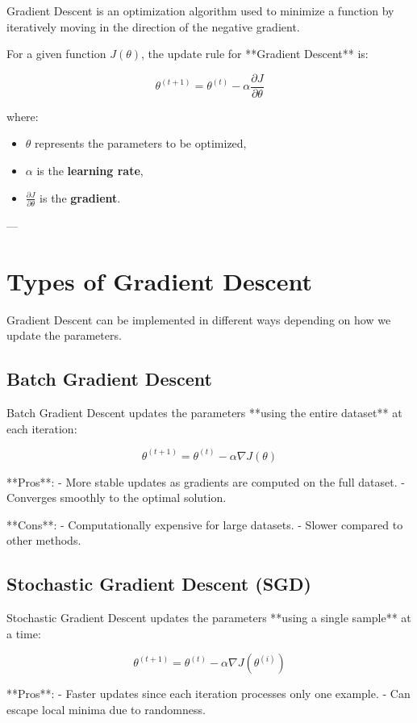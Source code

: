Gradient Descent is an optimization algorithm used to minimize a function by iteratively moving in the direction of the negative gradient.

For a given function \( J(\theta) \), the update rule for **Gradient Descent** is:

\[
\theta^{(t+1)} = \theta^{(t)} - \alpha \frac{\partial J}{\partial \theta}
\]

where:
\begin{itemize}
    \item \( \theta \) represents the parameters to be optimized,
    \item \( \alpha \) is the \textbf{learning rate},
    \item \( \frac{\partial J}{\partial \theta} \) is the \textbf{gradient}.
\end{itemize}

---

\section{Types of Gradient Descent}

Gradient Descent can be implemented in different ways depending on how we update the parameters.

\subsection{Batch Gradient Descent}
Batch Gradient Descent updates the parameters **using the entire dataset** at each iteration:

\[
\theta^{(t+1)} = \theta^{(t)} - \alpha \nabla J(\theta)
\]

**Pros**:
- More stable updates as gradients are computed on the full dataset.
- Converges smoothly to the optimal solution.

**Cons**:
- Computationally expensive for large datasets.
- Slower compared to other methods.

\subsection{Stochastic Gradient Descent (SGD)}
Stochastic Gradient Descent updates the parameters **using a single sample** at a time:

\[
\theta^{(t+1)} = \theta^{(t)} - \alpha \nabla J(\theta^{(i)})
\]

**Pros**:
- Faster updates since each iteration processes only one example.
- Can escape local minima due to randomness.

